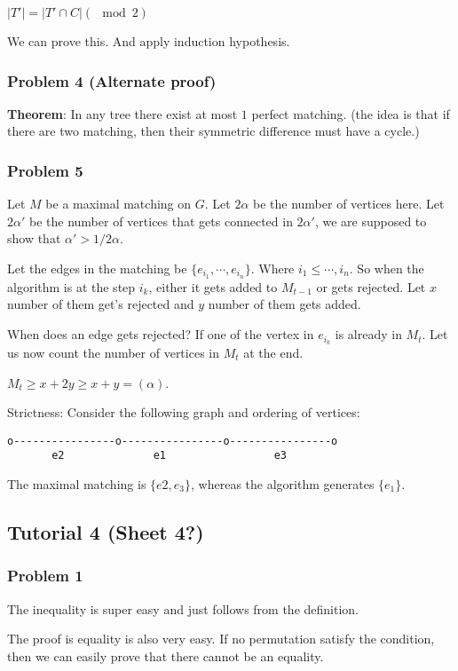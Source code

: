 \documentclass[11pt]{article}
\begin{document}
\(\vert T' \vert = \vert T' \cap C \vert (\mod 2)\)

We can prove this. And apply induction hypothesis.
\subsubsection{Problem 4 (Alternate proof)}
\label{sec:org2d7524f}
\textbf{Theorem}: In any tree there exist at most \(1\) perfect matching. (the idea
 is that if there are two matching, then their symmetric difference must
 have a cycle.)
\subsubsection{Problem 5}
\label{sec:org293c49c}
Let \(M\) be a maximal matching on \(G\). Let \(2\alpha\) be the number of
vertices here. Let \(2\alpha'\) be the number of vertices that gets connected
in \(2\alpha'\), we are supposed to show that \(\alpha' > 1/2 \alpha\).

Let the edges in the matching be \(\{e_{i_1}, \cdots, e_{i_n}\}\). Where \(i_1
    \le \cdots, i_n\). So when the algorithm is at the step \(i_k\), either it gets
added to \(M_{t-1}\) or gets rejected. Let \(x\) number of them get's rejected
and \(y\) number of them gets added.

When does an edge gets rejected? If one of the vertex in \(e_{i_k}\) is
already in \(M_{t}\). Let us now count the number of vertices in \(M_t\) at the
end.

\(M_t \ge x + 2y \ge x+y = (\alpha)\).

Strictness: Consider the following graph and ordering of vertices:
\begin{verbatim}
o----------------o----------------o----------------o
       e2              e1                 e3
\end{verbatim}

The maximal matching is \(\{e2, e_3\}\), whereas the algorithm generates
\(\{e_1\}\).
\subsection{Tutorial 4 (Sheet 4?)}
\label{sec:orgc63722a}
\subsubsection{Problem 1}
\label{sec:orgc683d95}
The inequality is super easy and just follows from the definition.

The proof is equality is also very easy. If no permutation satisfy the
condition, then we can easily prove that there cannot be an equality.
\end{document}
